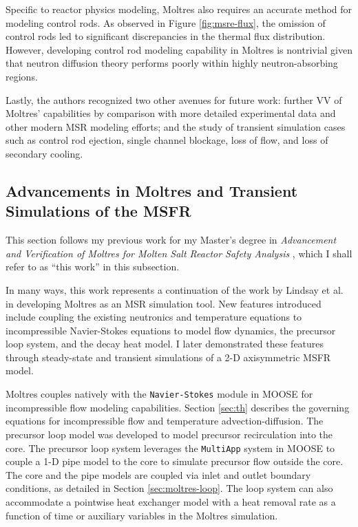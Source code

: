 Specific to reactor physics modeling, Moltres also requires an accurate method for modeling
control rods. As observed in Figure \ref{fig:msre-flux}, the omission of control rods led to
significant discrepancies in the thermal flux distribution. However, developing control rod
modeling capability in Moltres is nontrivial given that neutron diffusion theory performs poorly
within highly neutron-absorbing regions.

Lastly, the authors recognized two other avenues for future work: further \gls{VV} of Moltres'
capabilities by comparison
with more detailed experimental data and other modern \gls{MSR} modeling
efforts; and the study of transient simulation cases such as control rod
ejection, single channel blockage, loss of flow, and loss of secondary cooling.

\subsection{Advancements in Moltres and Transient Simulations of the MSFR}
\label{sec:msfr}

This section follows my previous work for my Master's degree in \textit{Advancement and
Verification of Moltres for Molten Salt Reactor Safety Analysis} \cite{park_advancement_2020},
which I shall refer to as ``this work'' in this subsection.

In many ways, this work represents a continuation of the work by Lindsay et al.
\cite{lindsay_introduction_2018} in developing Moltres as an \gls{MSR}
simulation tool. New features introduced include coupling the existing
neutronics and temperature equations to incompressible Navier-Stokes equations
to model flow dynamics, the precursor loop system, and the decay heat model.
I later demonstrated these features through steady-state and transient
simulations of a 2-D axisymmetric \gls{MSFR} model.

Moltres couples natively with the \texttt{Navier-Stokes} module in \gls{MOOSE} for
incompressible flow modeling capabilities. Section \ref{sec:th} describes the governing equations
for incompressible flow and temperature advection-diffusion.
The precursor loop model was developed to model
precursor recirculation into the core. The precursor loop system leverages
the \texttt{MultiApp} system in \gls{MOOSE} to couple a 1-D pipe model to the
core to simulate precursor flow outside the core. The core and the pipe models
are coupled via inlet and outlet boundary conditions, as detailed in Section
\ref{sec:moltres-loop}. The loop system can also accommodate a pointwise heat
exchanger model with a heat removal rate as a function of time
or auxiliary variables in the Moltres simulation.

